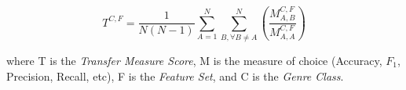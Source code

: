 \begin{equation} \label{chap:eval_methods:eq:office_doc_ensemble}
	T^{C,F} = \frac{1}{N(N-1)} \sum_{A=1}^{N} \sum_{B, \forall B \neq A}^{N} \left(  \frac{M^{C,F}_{A,B}}{M^{C,F}_{A,A}} \right)
	\end{equation}

	\noindent	
where T is the \textit{Transfer Measure Score}, M is the measure of choice (Accuracy, $F_1$, Precision, Recall, etc), F is the \textit{Feature Set}, and C is the \textit{Genre Class}. 
























